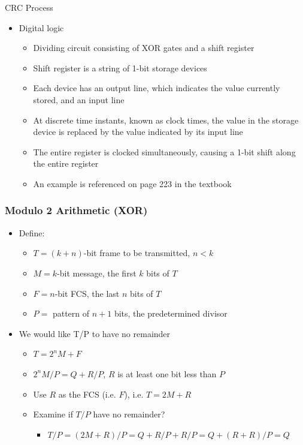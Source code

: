 \documentclass[pdflatex,compress]{beamer}
\begin{document}
\begin{frame}{CRC Process}
	\begin{itemize}
		\item Digital logic
		\begin{itemize}
			\item Dividing circuit consisting of XOR gates and a shift register
			\item Shift register is a string of 1-bit storage devices
			\item Each device has an output line, which indicates the value currently stored, and an input line
			\item At discrete time instants, known as clock times, the value in the storage device is replaced by the value indicated by its input line
			\item The entire register is clocked simultaneously, causing a 1-bit shift along the entire register
			\item An example is referenced on page 223 in the textbook
		\end{itemize}
	\end{itemize}
\end{frame}

\begin{frame}
	\frametitle{Modulo 2 Arithmetic (XOR)}
	\begin{itemize}
		\item Define:
		\begin{itemize}
			\item $ T = (k+n) $-bit frame to be transmitted, $ n < k $
			\item $ M = k $-bit message, the first $ k $ bits of $ T $
			\item $ F = n $-bit FCS, the last $ n $ bits of $ T $
			\item $ P = $ pattern of $ n+1 $ bits, the predetermined divisor
		\end{itemize}
		\item We would like T/P to have no remainder
		\begin{itemize}
			\item $ T=2^n M+F $
			\item $ 2^n M/P = Q + R/P $, $ R $ is at least one bit less than $ P $
			\item Use $ R $ as the FCS (i.e. $ F $), i.e. $ T = 2 M + R $
			\item Examine if $ T/P $ have no remainder?
			\begin{itemize}
				\item $ T/P = (2 M + R)/P = Q + R/P + R/P = Q + (R+R)/P = Q $
			\end{itemize}
		\end{itemize}
	\end{itemize}
\end{frame}
\end{document}
